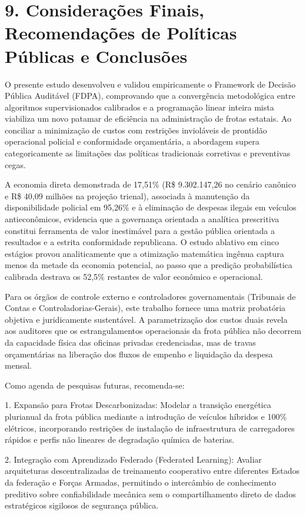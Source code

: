 \documentclass[10pt,a4paper,journal]{article}
\begin{document}
\section{9. Considerações Finais, Recomendações de Políticas Públicas e Conclusões}
O presente estudo desenvolveu e validou empiricamente o Framework de Decisão Pública Auditável (FDPA), comprovando que a convergência metodológica entre algoritmos supervisionados calibrados e a programação linear inteira mista viabiliza um novo patamar de eficiência na administração de frotas estatais. Ao conciliar a minimização de custos com restrições invioláveis de prontidão operacional policial e conformidade orçamentária, a abordagem supera categoricamente as limitações das políticas tradicionais corretivas e preventivas cegas.

A economia direta demonstrada de 17,51\% (R\$ 9.302.147,26 no cenário canônico e R\$ 40,09 milhões na projeção trienal), associada à manutenção da disponibilidade policial em 95,26\% e à eliminação de despesas ilegais em veículos antieconômicos, evidencia que a governança orientada a analítica prescritiva constitui ferramenta de valor inestimável para a gestão pública orientada a resultados e a estrita conformidade republicana. O estudo ablativo em cinco estágios provou analiticamente que a otimização matemática ingênua captura menos da metade da economia potencial, ao passo que a predição probabilística calibrada destrava os 52,5\% restantes de valor econômico e operacional.

Para os órgãos de controle externo e controladores governamentais (Tribunais de Contas e Controladorias-Gerais), este trabalho fornece uma matriz probatória objetiva e juridicamente sustentável. A parametrização dos custos duais revela aos auditores que os estrangulamentos operacionais da frota pública não decorrem da capacidade física das oficinas privadas credenciadas, mas de travas orçamentárias na liberação dos fluxos de empenho e liquidação da despesa mensal.

Como agenda de pesquisas futuras, recomenda-se:

1. Expansão para Frotas Descarbonizadas: Modelar a transição energética plurianual da frota pública mediante a introdução de veículos híbridos e 100\% elétricos, incorporando restrições de instalação de infraestrutura de carregadores rápidos e perfis não lineares de degradação química de baterias.

2. Integração com Aprendizado Federado (Federated Learning): Avaliar arquiteturas descentralizadas de treinamento cooperativo entre diferentes Estados da federação e Forças Armadas, permitindo o intercâmbio de conhecimento preditivo sobre confiabilidade mecânica sem o compartilhamento direto de dados estratégicos sigilosos de segurança pública.
\end{document}
